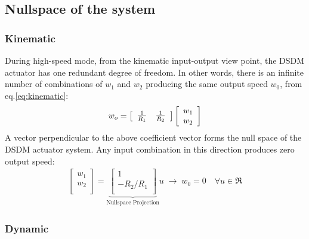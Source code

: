 \subsection{Nullspace of the system}

\subsubsection{Kinematic}

During high-speed mode, from the kinematic input-output view point, the DSDM actuator has one redundant degree of freedom. In other words, there is an infinite number of combinations of $w_1$ and $w_2$ producing the same output speed $w_0$, from eq.\eqref{eq:kinematic}:  
%
\begin{align}
w_o
 = 
\left[
\begin{array}{c c}
\frac{1}{R_1} & \frac{1}{R_2}
\end{array}
\right]
\left[
\begin{array}{c}
w_1 \\
w_2 \\
\end{array}
\right]
\end{align}
%
A vector perpendicular to the above coefficient vector forms the null space of the DSDM actuator system. Any input combination in this direction produces zero output speed:
%
\begin{align}
\left[
\begin{array}{c}
w_1 \\
w_2 \\
\end{array}
\right]=
\underbrace{\left[
\begin{array}{c}
1 \\
-R_2/R_1 \\
\end{array}
\right]}_{\text{Nullspace Projection}}
u  \; \rightarrow \;
w_0 = 0 \quad \forall u \in \Re
\label{eq:kinematicnullspace}
\end{align}
%

\subsubsection{Dynamic}

